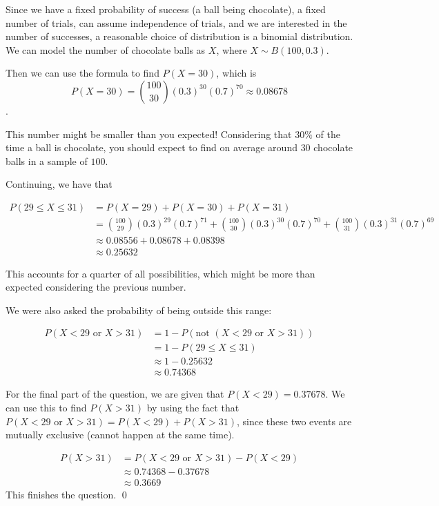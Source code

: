 \begin{solution}
    Since we have a fixed probability of success (a ball being chocolate), a fixed number of trials, can assume independence of trials, and we are interested in the number of successes, 
    a reasonable choice of distribution is a binomial distribution. We can model the number of chocolate balls as $X$, where $X \sim B(100,0.3)$.

    Then we can use the formula to find $P(X=30)$, which is 
    \[P(X=30) = \binom{100}{30} (0.3)^{30} (0.7)^{70} \approx 0.08678\].

    This number might be smaller than you expected! Considering that $30\%$ of the time a ball is chocolate, you should expect to find on average around $30$ chocolate balls in a sample of $100$.

    Continuing, we have that

    \begin{align*}
        P(29\leq X \leq 31) &= P(X=29) + P(X=30) + P(X=31) \\
         &= \binom{100}{29} (0.3)^{29} (0.7)^{71} + \binom{100}{30} (0.3)^{30} (0.7)^{70} + \binom{100}{31} (0.3)^{31} (0.7)^{69}\\
            &\approx 	0.08556 + 0.08678 + 0.08398 \\
            &\approx 0.25632
    \end{align*}

    This accounts for a quarter of all possibilities, which might be more than expected considering the previous number.

    We were also asked the probability of being outside this range:

    \begin{align*}
        P(X<29 \text{ or } X>31) &= 1 - P(\text{not } (X<29 \text{ or } X>31)) \tag{the full area is $1$}\\
        &= 1 - P(29\leq X \leq 31) \\
        &\approx 1 - 0.25632 \\
        &\approx 0.74368
    \end{align*}

    For the final part of the question, we are given that $P(X<29) = 0.37678$. We can use this to find $P(X>31)$ by using the fact that $P(X<29 \text{ or } X>31) = P(X<29) + P(X>31)$, since these two events are mutually exclusive (cannot happen at the same time).

    \begin{align*}
        P(X>31) &= P(X<29 \text{ or } X>31) - P(X<29) \\
        &\approx 0.74368 - 0.37678 \\
        &\approx 0.3669
    \end{align*}
    This finishes the question.
    \qed
\end{solution}

